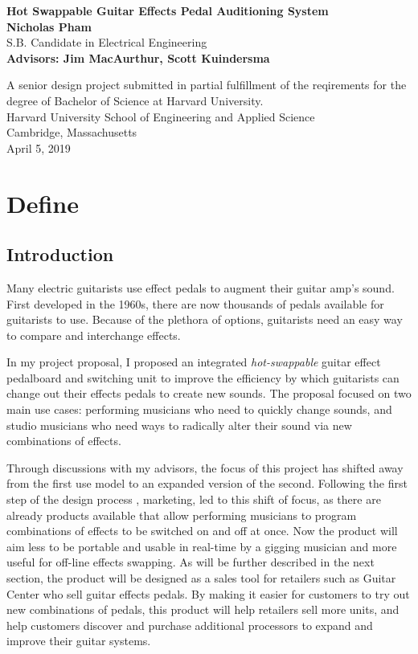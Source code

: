 \documentclass{article}
\begin{document}
\begin{center}
	\vspace*{0.5in}
	\huge
	\textbf{Hot Swappable Guitar Effects Pedal Auditioning System}\\
	\vspace*{1in}
	\Large
	\textbf{Nicholas Pham} \\
	\normalsize
	S.B. Candidate in Electrical Engineering \\
	\vspace*{0.5in}
	\textbf{Advisors: Jim MacAurthur, Scott Kuindersma}

	\vfill

	A senior design project submitted in partial fulfillment of the reqirements for the degree of Bachelor of Science at Harvard University. \\
    Harvard University School of Engineering and Applied Science \\
    Cambridge, Massachusetts \\
    April 5, 2019
\end{center}

\newpage
\glsaddall
\printglossaries
\newpage


\color{gray}
\section{Define}
	\subsection{Introduction}
	
	Many electric guitarists use effect pedals to augment their guitar amp's sound.  First developed in the 1960s, there are now thousands of pedals available for guitarists to use.  Because of the plethora of options, guitarists need an easy way to compare and interchange effects.

	In my project proposal, I proposed an integrated \emph{hot-swappable} guitar effect pedalboard and switching unit to improve the efficiency by which guitarists can change out their effects pedals to create new sounds.  The proposal focused on two main use cases: performing musicians who need to quickly change sounds, and studio musicians who need ways to radically alter their sound via new combinations of effects.

	Through discussions with my advisors, the focus of this project has shifted away from the first use model to an expanded version of the second.  Following the first step of the design process \cite{ES100Lec3}, marketing, led to this shift of focus, as there are already products available that allow performing musicians to program combinations of effects to be switched on and off at once.  Now the product will aim less to be portable and usable in real-time by a gigging musician and more useful for off-line effects swapping.  As will be further described in the next section, the product will be designed as a sales tool for retailers such as Guitar Center who sell guitar effects pedals.  By making it easier for customers to try out new combinations of pedals, this product will help retailers sell more units, and help customers discover and purchase additional processors to expand and improve their guitar systems.
	
\end{document}
